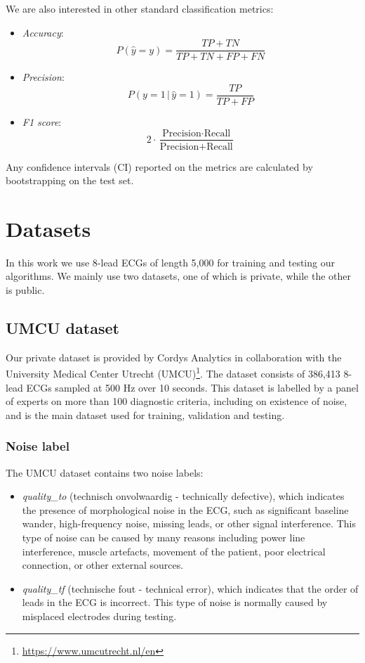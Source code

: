 \documentclass[a4paper,10pt]{article}
\begin{document}
We are also interested in other standard classification metrics:
\begin{itemize}
	\item \emph{Accuracy}:
	      \[
		      P(\hat{y} = y) = \frac{TP + TN}{TP + TN + FP + FN}
	      \]
	\item \emph{Precision}:
	      \[
		      P(y = 1 \,|\, \hat{y} = 1) = \frac{TP}{TP + FP}
	      \]
	\item \emph{F1 score}:
	      \[
		      2 \cdot \frac{\text{Precision} \cdot \text{Recall}}{\text{Precision} + \text{Recall}}
	      \]
\end{itemize}

Any confidence intervals (CI) reported on the metrics are calculated by bootstrapping \cite{bootstrap} on the test set.

\section{Datasets}

In this work we use 8-lead ECGs of length 5,000 for training and testing our algorithms. We mainly use two datasets, one of which is private, while the other is public.

\subsection{UMCU dataset}
\label{sec:umcu_dataset}

Our private dataset is provided by Cordys Analytics in collaboration with the University Medical Center Utrecht (UMCU)\footnote{\url{https://www.umcutrecht.nl/en}}. The dataset consists of 386,413 8-lead ECGs sampled at 500 Hz over 10 seconds. This dataset is labelled by a panel of experts on more than 100 diagnostic criteria, including on existence of noise, and is the main dataset used for training, validation and testing.
\subsubsection{Noise label}

The UMCU dataset contains two noise labels:
\begin{itemize}
	\item \emph{quality\_to} (technisch onvolwaardig - technically defective), which indicates the presence of morphological noise in the ECG, such as significant baseline wander, high-frequency noise, missing leads, or other signal interference. This type of noise can be caused by many reasons including power line interference, muscle artefacts, movement of the patient, poor electrical connection, or other external sources.
	\item \emph{quality\_tf} (technische fout - technical error), which indicates that the order of leads in the ECG is incorrect. This type of noise is normally caused by misplaced electrodes during testing.
\end{itemize}
\end{document}
